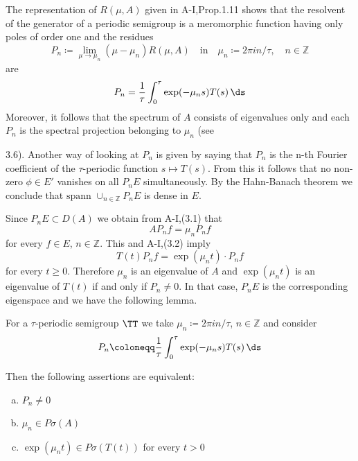 The representation of $R(\mu,A)$ given in A-I,Prop.1.11 shows that the resolvent of the generator of a periodic semigroup is a meromorphic function having only poles of order one and the residues
\[
P_{n} \coloneqq \lim_{\mu \to \mu_{n}} (\mu-\mu_{n})R(\mu,A) \quad \text{in} \quad \mu_{n} \coloneqq 2\pi in/\tau, \quad n \in \mathbb{Z}
\]
are
\begin{equation}\label{eq:a3-5.2}
P_{n} = \frac{1}{\tau}\int_{0}^{\tau}\exp(-\mu_{n}s)T(s) \, \ds
\end{equation}
Moreover, it follows that the spectrum of $A$ consists of eigenvalues only and each $P_{n}$ is the spectral projection belonging to $\mu_{n}$ (see



\newpage
3.6). Another way of looking at $P_{n}$ is given by saying that $P_{n}$ is the n-th Fourier coefficient of the $\tau$-periodic function $s \mapsto T(s)$.
From this it follows that no non-zero $\phi \in E'$ vanishes on all $P_{n}E$ simultaneously.
By the Hahn-Banach theorem we conclude that $\text{spann } \cup_{n \in \mathbb{Z}} P_{n}E$ is dense in $E$.

Since $P_{n}E \subset D(A)$ we obtain from A-I,(3.1) that
\begin{equation}\label{eq:a3-5.3}
AP_{n}f = \mu_{n}P_{n}f
\end{equation}
for every $f \in E$, $n \in \mathbb{Z}$.
This and A-I,(3.2) imply
\begin{equation}\label{eq:a3-5.4}
T(t)P_{n}f = \exp(\mu_{n}t) \cdot P_{n}f
\end{equation}
for every $t \geq 0$.
Therefore $\mu_{n}$ is an eigenvalue of $A$ and $\exp(\mu_{n}t)$ is an eigenvalue of $T(t)$ if and only if $P_{n} \neq 0$.
In that case, $P_{n}E$ is the corresponding eigenspace and we have the following lemma.
\begin{lemma}\label{lem:a3-5.3}

For a $\tau$-periodic semigroup $\TT$ we take $\mu_{n} \coloneqq 2\pi in/\tau$, $n \in \mathbb{Z}$ and consider
\[
P_{n} \coloneqq \frac{1}{\tau}\int_{0}^{\tau} \exp(-\mu_{n}s)T(s) \, \ds
\]

Then the following assertions are equivalent:
\begin{enumerate}[(a)]
\item $P_{n} \neq 0$

\item $\mu_{n} \in P\sigma(A)$

\item $\exp(\mu_{n}t) \in P\sigma(T(t))$ for every $t > 0$
\end{enumerate}
\end{lemma}

